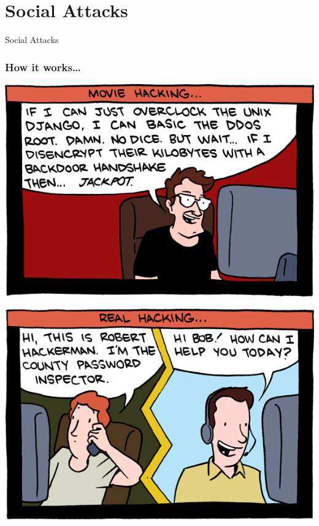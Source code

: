\documentclass[aspectratio=169,dvipsnames]{beamer}
\begin{document}

\section{Social Attacks}
\begin{frame}
\begin{center}
\huge Social Attacks
\end{center}
\end{frame}

\begin{frame}
\frametitle{How it works\dots}
\begin{minipage}[t]{0.49\textwidth}
\begin{center}
\vspace*{-15pt}
\includegraphics[width=\textwidth,keepaspectratio]{images/hackerman-1}
\end{center}
\end{minipage}
\begin{minipage}[t]{0.49\textwidth}
\begin{center}
\vspace*{15pt}
\includegraphics[width=\textwidth,keepaspectratio]{images/hackerman-2}
\end{center}
\end{minipage}
\end{frame}
\end{document}
